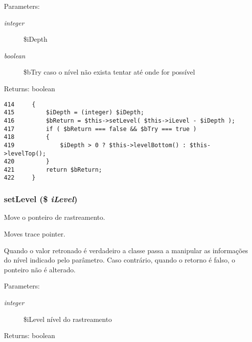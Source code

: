 \begin{Desc}
\item[Parameters:]
\begin{description}
\item[{\em integer}]\$iDepth \item[{\em boolean}]\$bTry caso o nível não exista tentar até onde for possível \end{description}
\end{Desc}
\begin{Desc}
\item[Returns:]boolean \end{Desc}


\begin{Code}\begin{verbatim}414     {
415         $iDepth = (integer) $iDepth;
416         $bReturn = $this->setLevel( $this->iLevel - $iDepth );
417         if ( $bReturn === false && $bTry === true )
418         {
419             $iDepth > 0 ? $this->levelBottom() : $this->levelTop();
420         }
421         return $bReturn;
422     }
\end{verbatim}
\end{Code}


\hypertarget{class_back_trace_ecef87c7823ef2809065c1544f7a57e9}{
\subsubsection[{setLevel}]{\setlength{\rightskip}{0pt plus 5cm}setLevel (\$ {\em iLevel})}}
\label{class_back_trace_ecef87c7823ef2809065c1544f7a57e9}


Move o ponteiro de rastreamento.

Moves trace pointer.

Quando o valor retronado é verdadeiro a classe passa a manipular as informações do nível indicado pelo parâmetro. Caso contrário, quando o retorno é falso, o ponteiro não é alterado.

\begin{Desc}
\item[Parameters:]
\begin{description}
\item[{\em integer}]\$iLevel nível do rastreamento \end{description}
\end{Desc}
\begin{Desc}
\item[Returns:]boolean \end{Desc}


